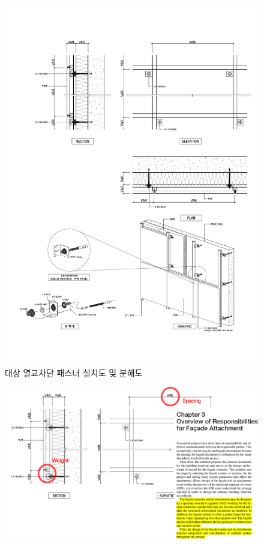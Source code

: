 \documentclass[9pt]{beamer}
\begin{document}
	\begin{frame}
\begin{figure}
\includegraphics[height=.65\textheight]{SINGLE_BASIC_DRAWINGS_01}
\caption{대상 열교차단 패스너 설치도 및 분해도}
\end{figure}
	\end{frame}
	\begin{frame}
\begin{figure}
\includegraphics[height=.75\textheight]{image04}
\end{figure}
	\end{frame}
\end{document}
